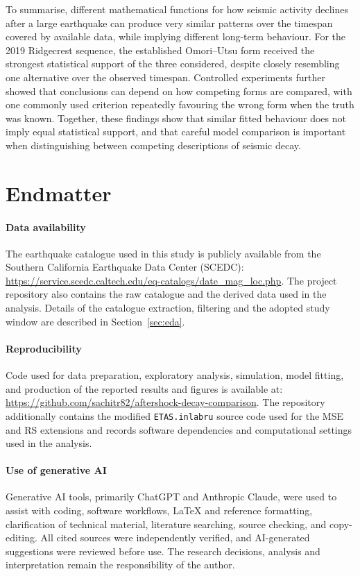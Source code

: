 \documentclass{statsmsc}
\begin{document}
To summarise, different mathematical functions for how seismic activity declines after a large earthquake can produce very similar patterns over the timespan covered by available data, while implying different long-term behaviour. For the 2019 Ridgecrest sequence, the established Omori--Utsu form received the strongest statistical support of the three considered, despite closely resembling one alternative over the observed timespan. Controlled experiments further showed that conclusions can depend on how competing forms are compared, with one commonly used criterion repeatedly favouring the wrong form when the truth was known. Together, these findings show that similar fitted behaviour does not imply equal statistical support, and that careful model comparison is important when distinguishing between competing descriptions of seismic decay.
    
\section{Endmatter} \label{sec:endmatter}
\paragraph{Data availability} The earthquake catalogue used in this study is publicly available from the Southern California Earthquake Data Center (SCEDC): \url{https://service.scedc.caltech.edu/eq-catalogs/date_mag_loc.php}. The project repository also contains the raw catalogue and the derived data used in the analysis. Details of the catalogue extraction, filtering and the adopted study window are described in Section~\ref{sec:eda}.

\paragraph{Reproducibility} Code used for data preparation, exploratory analysis, simulation, model fitting, and production of the reported results and figures is available at: \url{https://github.com/sachitr82/aftershock-decay-comparison}. The repository additionally contains the modified \texttt{ETAS.inlabru} source code used for the MSE and RS extensions and records software dependencies and computational settings used in the analysis.

\paragraph{Use of generative AI} Generative AI tools, primarily ChatGPT and Anthropic Claude, were used to assist with coding, software workflows, LaTeX and reference formatting, clarification of technical material, literature searching, source checking, and copy-editing. All cited sources were independently verified, and AI-generated suggestions were reviewed before use. The research decisions, analysis and interpretation remain the responsibility of the author.
\end{document}
